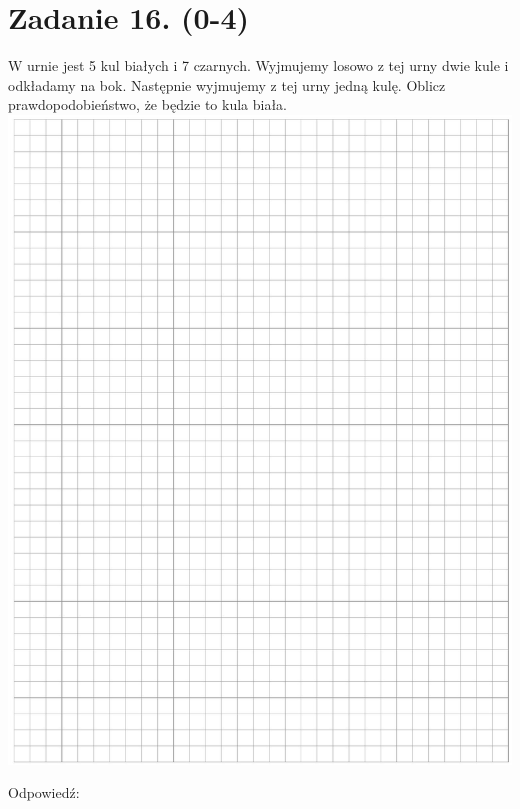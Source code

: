 \documentclass[10pt]{article}
\begin{document}
\section*{Zadanie 16. (0-4)}
W urnie jest 5 kul białych i 7 czarnych. Wyjmujemy losowo z tej urny dwie kule i odkładamy na bok. Następnie wyjmujemy z tej urny jedną kulę. Oblicz prawdopodobieństwo, że będzie to kula biała.\\
\includegraphics[max width=\textwidth, center]{2024_11_21_c0ca116654784d42326bg-13}

Odpowiedź:
\end{document}
